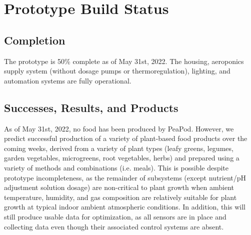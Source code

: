 \documentclass{../tex/report}
\begin{document}


\clearpage



\clearpage



\clearpage



\clearpage



\clearpage



\clearpage



\clearpage


% 

\section{Prototype Build Status}

\subsection{Completion}
The prototype is 50\% complete as of May 31st, 2022. The housing, aeroponics supply system (without dosage pumps or thermoregulation), lighting, and automation systems are fully operational.


\subsection{Successes, Results, and Products}

As of May 31st, 2022, no food has been produced by PeaPod. However, we predict successful production of a variety of plant-based food products over the coming weeks, derived from a variety of plant types (leafy greens, legumes, garden vegetables, microgreens, root vegetables, herbs) and prepared using a variety of methods and combinations (i.e. meals). This is possible despite prototype incompleteness, as the remainder of subsystems (except nutrient/pH adjustment solution dosage) are non-critical to plant growth when ambient temperature, humidity, and gas composition are relatively suitable for plant growth at typical indoor ambient atmospheric conditions. In addition, this will still produce usable data for optimization, as all sensors are in place and collecting data even though their associated control systems are absent.
\end{document}
